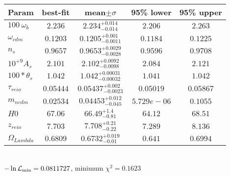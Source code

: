 \begin{tabular}{|l|c|c|c|c|} 
 \hline 
Param & best-fit & mean$\pm\sigma$ & 95\% lower & 95\% upper \\ \hline 
$100~\omega{}_{b }$ &$2.236$ & $2.234_{-0.014}^{+0.014}$ & $2.206$ & $2.263$ \\ 
$\omega{}_{cdm }$ &$0.1203$ & $0.1205_{-0.0011}^{+0.001}$ & $0.1184$ & $0.1225$ \\ 
$n_{s }$ &$0.9657$ & $0.9653_{-0.0028}^{+0.0029}$ & $0.9596$ & $0.9708$ \\ 
$10^{+9}A_{s }$ &$2.101$ & $2.102_{-0.0098}^{+0.0092}$ & $2.084$ & $2.121$ \\ 
$100*\theta{}_{s }$ &$1.042$ & $1.042_{-0.00032}^{+0.00031}$ & $1.041$ & $1.042$ \\ 
$\tau{}_{reio }$ &$0.05444$ & $0.05437_{-0.0023}^{+0.002}$ & $0.05019$ & $0.05867$ \\ 
$m_{ncdm }$ &$0.02534$ & $0.04453_{-0.045}^{+0.012}$ & $5.729e-06$ & $0.1055$ \\ 
$H0$ &$67.06$ & $66.49_{-0.81}^{+1.4}$ & $64.12$ & $68.51$ \\ 
$z_{reio }$ &$7.703$ & $7.708_{-0.22}^{+0.21}$ & $7.289$ & $8.136$ \\ 
$\Omega{}_{Lambda }$ &$0.6809$ & $0.6732_{-0.01}^{+0.019}$ & $0.641$ & $0.6994$ \\ 
\hline 
 \end{tabular} \\ 
$-\ln{\cal L}_\mathrm{min} =0.0811727$, minimum $\chi^2=0.1623$ \\ 
